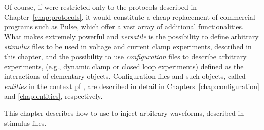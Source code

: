 Of course, if \progname were restricted only to the protocols
described in Chapter~\ref{chap:protocols}, it would constitute a
cheap replacement of commercial programs such as Pulse, which offer a
vast array of additional functionalities. What makes \progname
extremely powerful and \emph{versatile} is the possibility to define
arbitrary \emph{stimulus} files to be used in voltage and current
clamp experiments, described in this chapter, and the possibility to
use \emph{configuration} files to describe arbitrary experiments,
(e.g., dynamic clamp or closed loop experiments) defined as the
interactions of elementary objects. Configuration files and such
objects, called \emph{entities} in the context pf \progname, are
described in detail in Chapters~\ref{chap:configuration} and
\ref{chap:entities}, respectively.

This chapter describes how to use \progname to inject arbitrary
waveforms, described in stimulus files.
